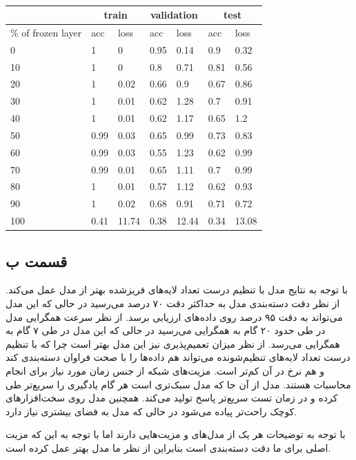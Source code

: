 \documentclass[12pt, a4paper]{article}
\begin{document}
\begin{latin}
    \begin{table}[h]
    \centering
    \caption{}
    \label{frozen_inception}
    \begin{tabular}{l||l|l||l|l||l|l}
        & \multicolumn{2}{c||}{train} & \multicolumn{2}{c||}{validation} & \multicolumn{2}{c}{test}\\ \hline
        \% of frozen layer & acc & loss & acc & loss & acc & loss \\ \hline
        0 & 1 & 0 & 0.95 & 0.14 & 0.9 & 0.32 \\ \hline
        10 & 1 & 0 & 0.8 & 0.71 & 0.81 & 0.56 \\ \hline
        20 & 1 & 0.02 & 0.66 & 0.9 & 0.67 & 0.86 \\ \hline
        30 & 1 & 0.01 & 0.62 & 1.28 & 0.7 & 0.91 \\ \hline
        40 & 1 & 0.01 & 0.62 & 1.17 & 0.65 & 1.2 \\ \hline
        50 & 0.99 & 0.03 & 0.65 & 0.99 & 0.73 & 0.83 \\ \hline
        60 & 0.99 & 0.03 & 0.55 & 1.23 & 0.62 & 0.99 \\ \hline
        70 & 0.99 & 0.01 & 0.65 & 1.11 & 0.7 & 0.99 \\ \hline
        80 & 1 & 0.01 & 0.57 & 1.12 & 0.62 & 0.93 \\ \hline
        90 & 1 & 0.02 & 0.68 & 0.91 & 0.71 & 0.72 \\ \hline
        100 & 0.41 & 11.74 & 0.38 & 12.44 & 0.34 & 13.08
    \end{tabular}
\end{table}
\end{latin}

\subsection*{قسمت ب}

با توجه به نتایج مدل  با تنظیم درست تعداد لایه‌های فریزشده بهتر از مدل  عمل می‌کند.
از نظر دقت دسته‌بندی مدل  به حداکثر دقت ۷۰ درصد می‌رسید در حالی که این مدل می‌تواند به دقت ۹۵ درصد
روی داده‌های ارزیابی برسد. از نظر سرعت همگرایی مدل  در طی حدود ۲۰ گام به همگرایی می‌رسید
در حالی که این مدل در طی ۷ گام به همگرایی می‌رسد. از نظر میزان تعمیم‌پذیری نیز این مدل بهتر است
چرا که با تنظیم درست تعداد لایه‌های تنظیم‌شونده می‌تواند هم داده‌ها را با صحت فراوان دسته‌بندی کند و هم نرخ 
در آن کم‌تر است. مزیت‌های شبکه  از جنس زمان مورد نیاز برای انجام محاسبات هستند. مدل  از آن جا
که مدل سبک‌تری است هر گام یادگیری را سریع‌تر طی کرده و در زمان تست سریع‌تر پاسخ تولید می‌کند. همچنین مدل  روی
سخت‌افزار‌های کوچک راحت‌تر پیاده می‌شود در حالی که مدل  به فضای بیشتری نیاز دارد.

با توجه به توضیحات هر یک از مدل‌های  و  مزیت‌هایی دارند اما با توجه به این که مزیت اصلی برای ما
دقت دسته‌بندی است بنابراین از نظر ما مدل  بهتر عمل کرده است.
\end{document}
